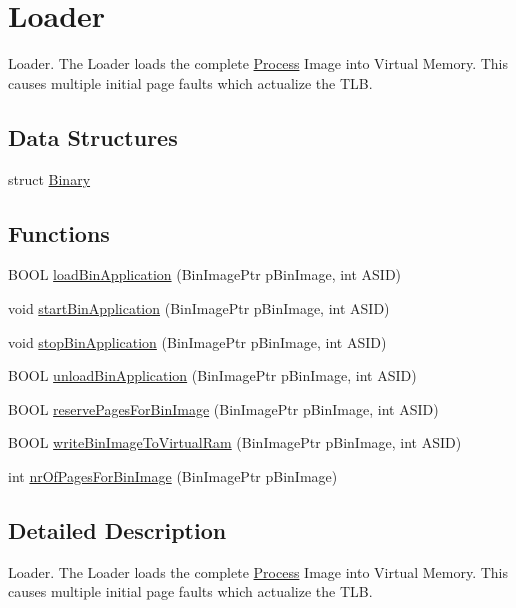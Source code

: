 \hypertarget{group___v_m_m___l_d_r}{
\section{Loader}
\label{group___v_m_m___l_d_r}
}
Loader. The Loader loads the complete \hyperlink{struct_process}{Process} Image into Virtual Memory. This causes multiple initial page faults which actualize the TLB.  


\subsection*{Data Structures}
\begin{CompactItemize}
\item 
struct \hyperlink{struct_binary}{Binary}
\end{CompactItemize}
\subsection*{Functions}
\begin{CompactItemize}
\item 
BOOL \hyperlink{group___v_m_m___l_d_r_gaf0bee09e9416fef2ebaa23cd84c329b}{loadBinApplication} (BinImagePtr pBinImage, int ASID)
\item 
void \hyperlink{group___v_m_m___l_d_r_gee5032b8bccc629d554bd321d74a71a5}{startBinApplication} (BinImagePtr pBinImage, int ASID)
\item 
void \hyperlink{group___v_m_m___l_d_r_gfa3edc54147d22b0e8e45491140576cb}{stopBinApplication} (BinImagePtr pBinImage, int ASID)
\item 
BOOL \hyperlink{group___v_m_m___l_d_r_gef6344ddde662c01f04ed17a53e80291}{unloadBinApplication} (BinImagePtr pBinImage, int ASID)
\item 
BOOL \hyperlink{group___v_m_m___l_d_r_g0b60ccd1a0871b94620f9206fc9e86a6}{reservePagesForBinImage} (BinImagePtr pBinImage, int ASID)
\item 
BOOL \hyperlink{group___v_m_m___l_d_r_g2774925688551490cf567ca10eddd33c}{writeBinImageToVirtualRam} (BinImagePtr pBinImage, int ASID)
\item 
int \hyperlink{group___v_m_m___l_d_r_ga457b6bb7d7447760750e4315be37e14}{nrOfPagesForBinImage} (BinImagePtr pBinImage)
\end{CompactItemize}


\subsection{Detailed Description}
Loader. The Loader loads the complete \hyperlink{struct_process}{Process} Image into Virtual Memory. This causes multiple initial page faults which actualize the TLB. 

